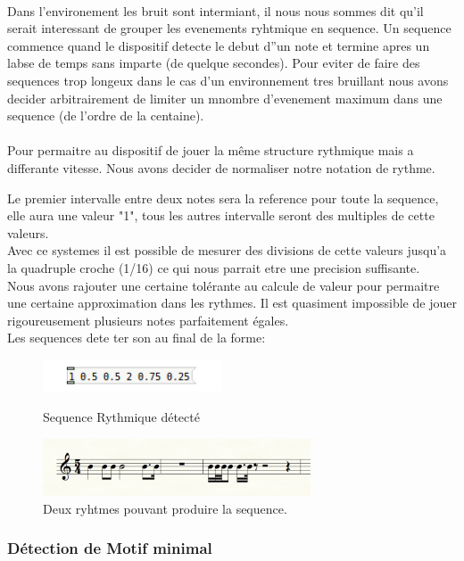 \documentclass[a4paper, titlepage, oneside, 12pt]{article}%
\begin{document}
\paragraph{}
Dans l'environement les bruit sont intermiant, il nous nous sommes dit qu'il serait interessant de grouper les evenements ryhtmique en sequence. Un sequence commence quand le dispositif detecte le debut d''un note et termine apres un labse de temps sans imparte (de quelque secondes). Pour eviter de faire des sequences trop longeux dans le cas d'un environnement tres bruillant nous avons decider arbitrairement de limiter un mnombre d'evenement maximum dans une sequence (de l'ordre de la centaine).

\paragraph{}
Pour permaitre au dispositif de jouer la même structure rythmique mais a differante vitesse. Nous avons decider de normaliser notre notation de rythme.

Le premier intervalle entre deux notes sera la reference pour toute la sequence, elle aura une valeur "1", tous les autres intervalle seront des multiples de cette valeurs.\\
Avec ce systemes il est possible de mesurer des divisions de cette valeurs jusqu'a la quadruple croche (1/16) ce qui nous parrait etre une precision suffisante.\\
Nous avons rajouter une certaine tolérante au calcule de valeur pour permaitre une certaine approximation dans les rythmes. Il est quasiment impossible de jouer rigoureusement plusieurs notes parfaitement égales.\\
Les sequences dete ter son au final de la forme:\\
\begin{figure}[H]
	\centering
	\includegraphics[width=200px] {rythme.jpg}
	\caption{ Sequence Rythmique détecté}
	\includegraphics[width=300px]{structurerythme.jpg}
	\caption{Deux ryhtmes pouvant produire la sequence.
	}
\end{figure}

\subsubsection{Détection de Motif minimal}
\end{document}

